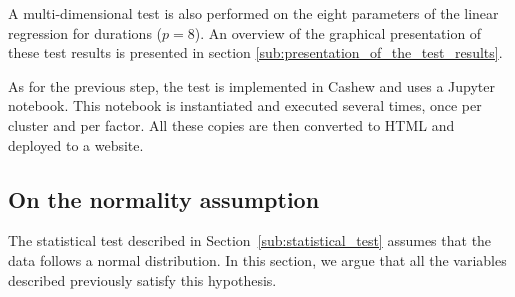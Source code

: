                 A multi-dimensional test is also performed on the eight parameters of the linear regression for \dgemm
                durations (\ie \(p=8\)).
                An overview of the graphical presentation of these test results is presented in section
                \ref{sub:presentation_of_the_test_results}.

                As for the previous step, the test is implemented in Cashew and uses a Jupyter notebook. This notebook
                is instantiated and executed several times, once per cluster and per factor. All these copies are then
                converted to HTML and deployed to a website.

        \subsection{On the normality assumption}%
        \label{sub:on_the_normality_assumption}

            The statistical test described in Section~\ref{sub:statistical_test} assumes that the data follows a normal
            distribution. In this section, we argue that all the variables described previously satisfy this hypothesis.

